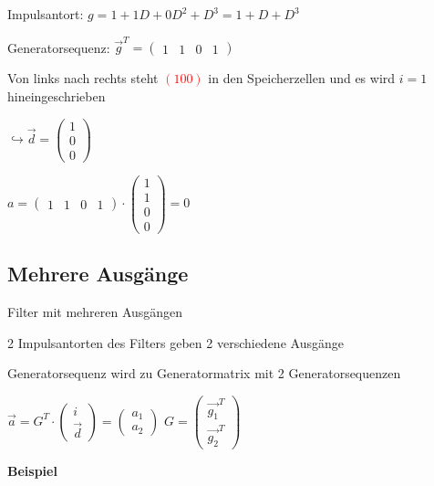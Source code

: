 Impulsantort: $\displaystyle{
    g = 1 + 1D + 0D^2 + D^3 = 1 + D + D^3
}$

Generatorsequenz: $\displaystyle{\vec{g}^T =
    \begin{pmatrix}
        1 & 1 & 0 & 1
    \end{pmatrix}
}$

Von links nach rechts steht \textcolor{red}{$ (1 0 0) $} in den Speicherzellen und es wird $i = 1$ hineingeschrieben

$\displaystyle{
    \hookrightarrow \vec{d} = \begin{pmatrix}
        1\\
        0\\
        0
    \end{pmatrix}
}$

$\displaystyle{
    a = \begin{pmatrix}
        1 & 1 & 0 & 1
    \end{pmatrix}
    \cdot
    \begin{pmatrix}
        1\\
        1\\
        0\\
        0
    \end{pmatrix}
    = 0    
}$

\subsection{Mehrere Ausgänge}

Filter mit mehreren Ausgängen

2 Impulsantorten des Filters geben 2 verschiedene Ausgänge

Generatorsequenz wird zu Generatormatrix mit 2 Generatorsequenzen

$\displaystyle{
    \vec{a} = G^T \cdot
    \begin{pmatrix}
        i\\
        \vec{d}
    \end{pmatrix} =
    \begin{pmatrix}
        a_1\\
        a_2
    \end{pmatrix}
}$\;\;\;\;\;\;\;\;\;\;\;\;\;
$\displaystyle{
    G =
    \begin{pmatrix}
        \vec{g_1}^T\\
        \vec{g_2}^T
    \end{pmatrix}
}$

\textbf{Beispiel}

